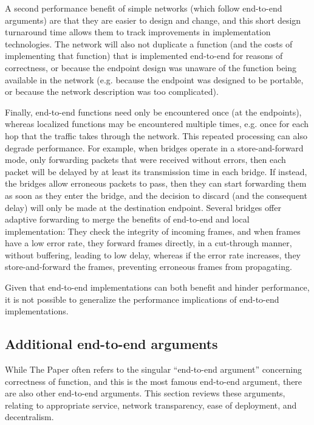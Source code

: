 \documentclass[a4paper,11pt,notitlepage,twoside,openright]{article}
\begin{document}
A second performance benefit of simple networks (which follow end-to-end
arguments) are that they are easier to design and change, and this short
design turnaround time allows them to track improvements in
implementation technologies. The network will also not duplicate a
function (and the costs of implementing that function) that is
implemented end-to-end for reasons of correctness, or because the
endpoint design was unaware of the function being available in the
network (e.g. because the endpoint was designed to be portable, or
because the network description was too complicated).

Finally, end-to-end functions need only be encountered once (at the
endpoints), whereas localized functions may be encountered multiple
times, e.g. once for each hop that the traffic takes through the
network. This repeated processing can also degrade performance. For
example, when bridges operate in a store-and-forward mode, only
forwarding packets that were received without errors, then each packet
will be delayed by at least its transmission time in each bridge. If
instead, the bridges allow erroneous packets to pass, then they can
start forwarding them as soon as they enter the bridge, and the decision
to discard (and the consequent delay) will only be made at the
destination endpoint. Several bridges offer adaptive forwarding to merge
the benefits of end-to-end and local implementation: They check the
integrity of incoming frames, and when frames have a low error rate,
they forward frames directly, in a cut-through manner, without
buffering, leading to low delay, whereas if the error rate increases,
they store-and-forward the frames, preventing erroneous frames from
propagating.

Given that end-to-end implementations can both benefit and hinder
performance, it is not possible to generalize the performance
implications of end-to-end implementations.

\hypertarget{additional-end-to-end-arguments}{%
\subsection{Additional end-to-end arguments
}\label{additional-end-to-end-arguments}}

While The Paper often refers to the singular ``end-to-end argument''
concerning correctness of function, and this is the most famous
end-to-end argument, there are also other end-to-end arguments. This
section reviews these arguments, relating to appropriate service,
network transparency, ease of deployment, and decentralism.
\end{document}
